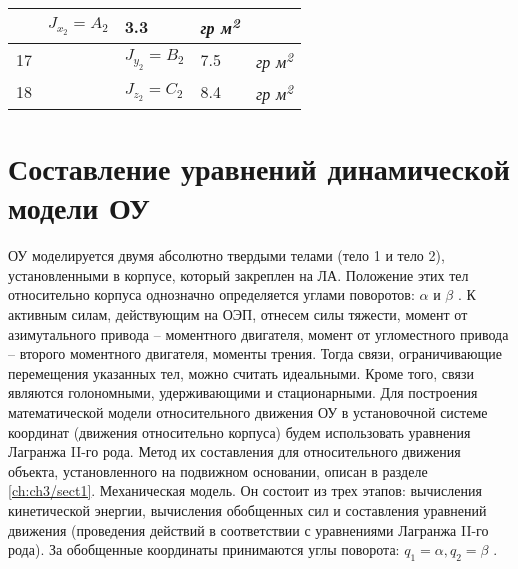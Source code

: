 {\begin{longtable}{p{0.66in}p{1.94in}p{0.71in}p{0.29in}p{0.49in}p{0.39in}p{0.66in}}
		\multicolumn{1}{|p{1.94in}}{} & 
		\multicolumn{1}{|p{0.71in}}{ \( J_{x_{2}}=A_{2} \) } & 
		\multicolumn{3}{|p{1.57in}}{3.3} & 
		\multicolumn{1}{|p{0.66in}|}{\textit{гр м\textsuperscript{2}}} \\
		\hline
		\multicolumn{1}{|p{0.66in}}{17} & 
		\multicolumn{1}{|p{1.94in}}{} & 
		\multicolumn{1}{|p{0.71in}}{ \( J_{y_{2}}=B_{2} \) } & 
		\multicolumn{3}{|p{1.57in}}{7.5} & 
		\multicolumn{1}{|p{0.66in}|}{\textit{гр м\textsuperscript{2}}} \\
		\hline
		\multicolumn{1}{|p{0.66in}}{18} & 
		\multicolumn{1}{|p{1.94in}}{} & 
		\multicolumn{1}{|p{0.71in}}{ \( J_{z_{2}}=C_{2} \) } & 
		\multicolumn{3}{|p{1.57in}}{8.4} & 
		\multicolumn{1}{|p{0.66in}|}{\textit{гр м\textsuperscript{2}}} \\
		\hline
		
\end{longtable}}


\section{Составление уравнений динамической модели ОУ} \label{ch:ch3/sect5}

ОУ моделируется двумя абсолютно твердыми телами (тело 1 и тело 2), установленными в корпусе, который закреплен на ЛА. Положение этих тел относительно корпуса однозначно определяется углами поворотов:  \(  \alpha  \)  и  \(  \beta  \) . К активным силам, действующим на ОЭП, отнесем силы тяжести, момент от азимутального привода – моментного двигателя, момент от угломестного привода – второго моментного двигателя, моменты трения. Тогда связи, ограничивающие перемещения указанных тел, можно считать идеальными. Кроме того, связи являются голономными, удерживающими и стационарными. Для построения математической модели относительного движения ОУ в установочной системе координат (движения относительно корпуса) будем использовать уравнения Лагранжа II-го рода. Метод их составления для относительного движения объекта, установленного на подвижном основании, описан в разделе \ref{ch:ch3/sect1}. Механическая модель. Он состоит из трех этапов: вычисления кинетической энергии, вычисления обобщенных сил и составления уравнений движения (проведения действий в соответствии с уравнениями Лагранжа II-го рода). За обобщенные координаты принимаются углы поворота:  \( q_{1}= \alpha ,q_{2}= \beta  \) .\par





